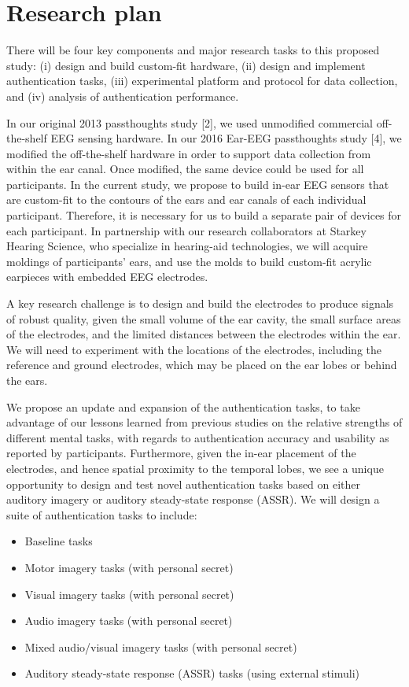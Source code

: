 \documentclass[11pt]{article}
\begin{document}
\section{Research plan}
\label{sec:org5e36c1a}

There will be four key components and major research tasks to this proposed
study: (i) design and build custom-fit hardware, (ii) design and implement
authentication tasks, (iii) experimental platform and protocol for data collection,
and (iv) analysis of authentication performance.

In our original 2013 passthoughts study [2], we used unmodified commercial off-
the-shelf EEG sensing hardware. In our 2016 Ear-EEG passthoughts study [4],
we modified the off-the-shelf hardware in order to support data collection from
within the ear canal. Once modified, the same device could be used for all
participants. In the current study, we propose to build in-ear EEG sensors that
are custom-fit to the contours of the ears and ear canals of each individual
participant. Therefore, it is necessary for us to build a separate pair of devices for
each participant. In partnership with our research collaborators at Starkey
Hearing Science, who specialize in hearing-aid technologies, we will acquire
moldings of participants’ ears, and use the molds to build custom-fit acrylic
earpieces with embedded EEG electrodes.

A key research challenge is to design and build the electrodes to produce signals
of robust quality, given the small volume of the ear cavity, the small surface
areas of the electrodes, and the limited distances between the electrodes within
the ear. We will need to experiment with the locations of the electrodes, including
the reference and ground electrodes, which may be placed on the ear lobes or
behind the ears.

We propose an update and expansion of the authentication tasks, to take
advantage of our lessons learned from previous studies on the relative strengths
of different mental tasks, with regards to authentication accuracy and usability as
reported by participants. Furthermore, given the in-ear placement of the
electrodes, and hence spatial proximity to the temporal lobes, we see a unique
opportunity to design and test novel authentication tasks based on either auditory
imagery or auditory steady-state response (ASSR). We will design a suite of
authentication tasks to include:

\begin{itemize}
\item Baseline tasks
\item Motor imagery tasks (with personal secret)
\item Visual imagery tasks (with personal secret)
\item Audio imagery tasks (with personal secret)
\item Mixed audio/visual imagery tasks (with personal secret)
\item Auditory steady-state response (ASSR) tasks (using external stimuli)
\end{itemize}
\end{document}
